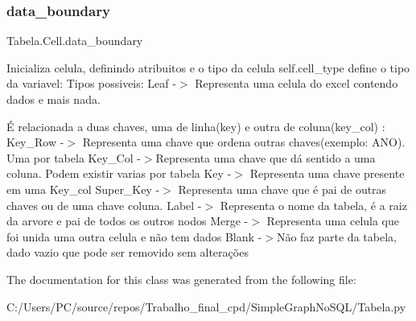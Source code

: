 \subsubsection{\texorpdfstring{data\+\_\+boundary}{data\_boundary}}
{\footnotesize\ttfamily Tabela.\+Cell.\+data\+\_\+boundary}



Inicializa celula, definindo atribuitos e o tipo da celula self.\+cell\+\_\+type define o tipo da variavel\+: Tipos possiveis\+: Leaf -\/$>$ Representa uma celula do excel contendo dados e mais nada. 

É relacionada a duas chaves, uma de linha(key) e outra de coluna(key\+\_\+col) \+: Key\+\_\+\+Row -\/$>$ Representa uma chave que ordena outras chaves(exemplo\+: A\+N\+O). Uma por tabela Key\+\_\+\+Col -\/$>$Representa uma chave que dá sentido a uma coluna. Podem existir varias por tabela Key -\/$>$ Representa uma chave presente em uma Key\+\_\+col Super\+\_\+\+Key -\/$>$ Representa uma chave que é pai de outras chaves ou de uma chave coluna. Label -\/$>$ Representa o nome da tabela, é a raiz da arvore e pai de todos os outros nodos Merge -\/$>$ Representa uma celula que foi unida uma outra celula e não tem dados Blank -\/$>$Não faz parte da tabela, dado vazio que pode ser removido sem alterações 

The documentation for this class was generated from the following file\+:\begin{DoxyCompactItemize}
\item 
C\+:/\+Users/\+P\+C/source/repos/\+Trabalho\+\_\+final\+\_\+cpd/\+Simple\+Graph\+No\+S\+Q\+L/Tabela.\+py\end{DoxyCompactItemize}
